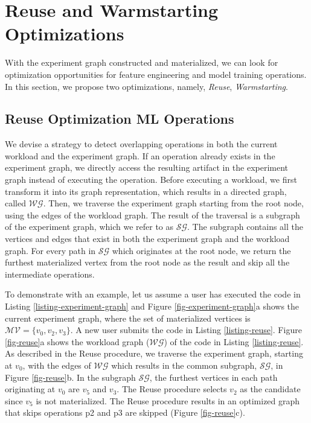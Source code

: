 \section{Reuse and Warmstarting Optimizations}\label{sec-reuse-and-warmstarting}
With the experiment graph constructed and materialized, we can look for optimization opportunities for feature engineering and model training operations.
In this section, we propose two optimizations, namely, \textit{Reuse}, \textit{Warmstarting}.

\subsection{Reuse Optimization ML Operations}
We devise a strategy to detect overlapping operations in both the current workload and the experiment graph.
If an operation already exists in the experiment graph, we directly access the resulting artifact in the experiment graph instead of executing the operation.
Before executing a workload, we first transform it into its graph representation, which results in a directed graph, called $\mathcal{WG}$.
Then, we traverse the experiment graph starting from the root node, using the edges of the workload graph.
The result of the traversal is a subgraph of the experiment graph, which we refer to as $\mathcal{SG}$.
The subgraph contains all the vertices and edges that exist in both the experiment graph and the workload graph.
For every path in $\mathcal{SG}$ which originates at the root node, we return the furthest materialized vertex from the root node as the result and skip all the intermediate operations.

To demonstrate with an example, let us assume a user has executed the code in Listing \ref{listing-experiment-graph} and Figure \ref{fig-experiment-graph}a shows the current experiment graph, where the set of materialized vertices is $\mathcal{MV} = \{v_0, v_2, v_3\}$.
A new user submits the code in Listing \ref{listing-reuse}.
Figure \ref{fig-reuse}a shows the workload graph ($\mathcal{WG}$) of the code in Listing \ref{listing-reuse}.
As described in the Reuse procedure, we traverse the experiment graph, starting at $v_0$, with the edges of $\mathcal{WG}$ which results in the common subgraph, $\mathcal{SG}$, in Figure \ref{fig-reuse}b.
In the subgraph $\mathcal{SG}$, the furthest vertices in each path originating at $v_0$ are $v_5$ and $v_3$.
The Reuse procedure selects $v_2$ as the candidate since $v_5$ is not materialized.
The Reuse procedure results in an optimized graph that skips operations p2 and p3 are skipped (Figure \ref{fig-reuse}c).

